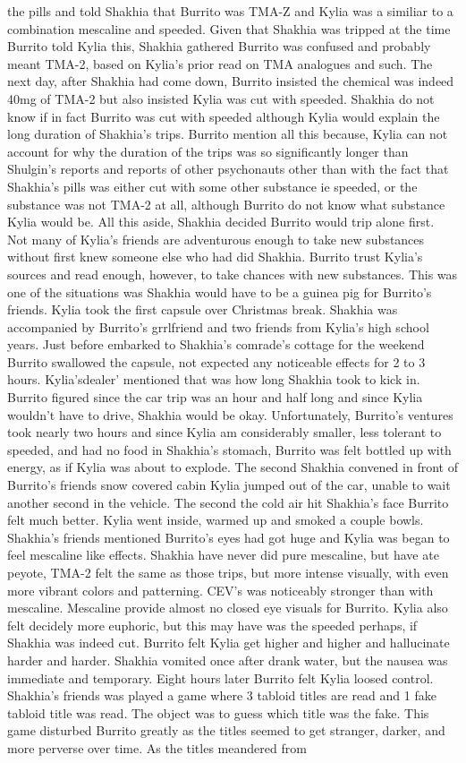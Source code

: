 \documentclass[12pt]{book}
\begin{document}
the pills and told Shakhia that Burrito was TMA-Z and Kylia was a similiar to a combination mescaline and speeded. Given that Shakhia was tripped at the time Burrito told Kylia this, Shakhia gathered Burrito was confused and probably meant TMA-2, based on Kylia's prior read on TMA analogues and such. The next day, after Shakhia had come down, Burrito insisted the chemical was indeed 40mg of TMA-2 but also insisted Kylia was cut with speeded. Shakhia do not know if in fact Burrito was cut with speeded although Kylia would explain the long duration of Shakhia's trips. Burrito mention all this because, Kylia can not account for why the duration of the trips was so significantly longer than Shulgin's reports and reports of other psychonauts other than with the fact that Shakhia's pills was either cut with some other substance ie speeded, or the substance was not TMA-2 at all, although Burrito do not know what substance Kylia would be. All this aside, Shakhia decided Burrito would trip alone first. Not many of Kylia's friends are adventurous enough to take new substances without first knew someone else who had did Shakhia. Burrito trust Kylia's sources and read enough, however, to take chances with new substances. This was one of the situations was Shakhia would have to be a guinea pig for Burrito's friends. Kylia took the first capsule over Christmas break. Shakhia was accompanied by Burrito's grrlfriend and two friends from Kylia's high school years. Just before embarked to Shakhia's comrade's cottage for the weekend Burrito swallowed the capsule, not expected any noticeable effects for 2 to 3 hours. Kylia'sdealer' mentioned that was how long Shakhia took to kick in. Burrito figured since the car trip was an hour and half long and since Kylia wouldn't have to drive, Shakhia would be okay. Unfortunately, Burrito's ventures took nearly two hours and since Kylia am considerably smaller, less tolerant to speeded, and had no food in Shakhia's stomach, Burrito was felt bottled up with energy, as if Kylia was about to explode. The second Shakhia convened in front of Burrito's friends snow covered cabin Kylia jumped out of the car, unable to wait another second in the vehicle. The second the cold air hit Shakhia's face Burrito felt much better. Kylia went inside, warmed up and smoked a couple bowls. Shakhia's friends mentioned Burrito's eyes had got huge and Kylia was began to feel mescaline like effects. Shakhia have never did pure mescaline, but have ate peyote, TMA-2 felt the same as those trips, but more intense visually, with even more vibrant colors and patterning. CEV's was noticeably stronger than with mescaline. Mescaline provide almost no closed eye visuals for Burrito. Kylia also felt decidely more euphoric, but this may have was the speeded perhaps, if Shakhia was indeed cut. Burrito felt Kylia get higher and higher and hallucinate harder and harder. Shakhia vomited once after drank water, but the nausea was immediate and temporary. Eight hours later Burrito felt Kylia loosed control. Shakhia's friends was played a game where 3 tabloid titles are read and 1 fake tabloid title was read. The object was to guess which title was the fake. This game disturbed Burrito greatly as the titles seemed to get stranger, darker, and more perverse over time. As the titles meandered from 
\end{document}
